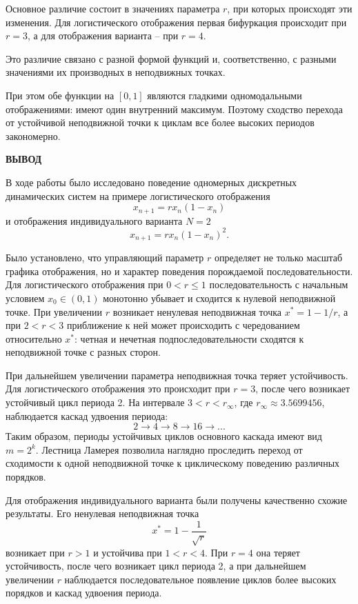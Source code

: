 \documentclass[14pt,a4paper]{extarticle}
\newcommand{\structelement}[1]{
\clearpage
\begin{center}
\bfseries\MakeUppercase{#1}
\end{center}
\addcontentsline{toc}{section}{#1}
\vspace{6pt}
}
\begin{document}
Основное различие состоит в значениях параметра $r$, при которых происходят эти изменения. Для логистического отображения первая бифуркация происходит при $r = 3$, а для отображения варианта – при $r = 4$.

Это различие связано с разной формой функций и, соответственно, с разными значениями их производных в неподвижных точках.

При этом обе функции на $[0,1]$ являются гладкими одномодальными отображениями: имеют один внутренний максимум. Поэтому сходство перехода от устойчивой неподвижной точки к циклам все более высоких периодов закономерно.

\clearpage



\structelement{Вывод}

В ходе работы было исследовано поведение одномерных дискретных динамических систем на примере логистического отображения
\[
x_{n+1} = rx_n(1 - x_n)
\]
и отображения индивидуального варианта $N = 2$
\[
x_{n+1} = rx_n(1 - x_n)^2.
\]

Было установлено, что управляющий параметр $r$ определяет не только масштаб графика отображения, но и характер поведения порождаемой последовательности. Для логистического отображения при $0 < r \leq 1$ последовательность с начальным условием $x_0 \in (0,1)$ монотонно убывает и сходится к нулевой неподвижной точке. При увеличении $r$ возникает ненулевая неподвижная точка $x^* = 1 - 1/r$, а при $2 < r < 3$ приближение к ней может происходить с чередованием относительно $x^*$: четная и нечетная подпоследовательности сходятся к неподвижной точке с разных сторон.

При дальнейшем увеличении параметра неподвижная точка теряет устойчивость. Для логистического отображения это происходит при $r = 3$, после чего возникает устойчивый цикл периода 2. На интервале $3 < r < r_{\infty}$, где $r_{\infty} \approx 3.5699456$, наблюдается каскад удвоения периода:
\[
2 \rightarrow 4 \rightarrow 8 \rightarrow 16 \rightarrow ...
\]
Таким образом, периоды устойчивых циклов основного каскада имеют вид $m = 2^k$. Лестница Ламерея позволила наглядно проследить переход от сходимости к одной неподвижной точке к циклическому поведению различных порядков.

Для отображения индивидуального варианта были получены качественно схожие результаты. Его ненулевая неподвижная точка
\[
x^* = 1 - \frac{1}{\sqrt{r}}
\]
возникает при $r > 1$ и устойчива при $1 < r < 4$. При $r = 4$ она теряет устойчивость, после чего возникает цикл периода 2, а при дальнейшем увеличении $r$ наблюдается последовательное появление циклов более высоких порядков и каскад удвоения периода.
\end{document}
